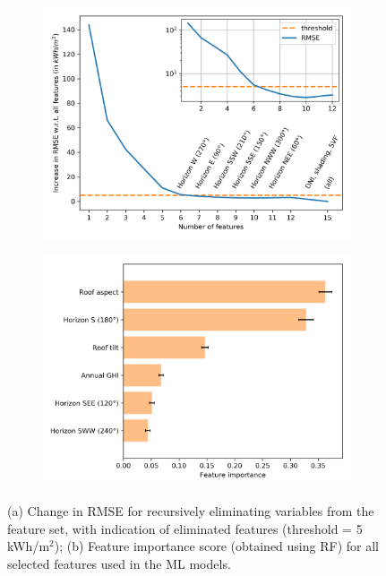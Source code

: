 \begin{figure}[tb]
\centering
\begin{subfigure}{.49\textwidth}
  \centering
  \includegraphics[width=\linewidth]{images/Figs/ftr_selection_topdown_reduced_run1_w_excluded.png}
  \subcaption{}
  \label{fig:chile_RFE}
\end{subfigure}
\begin{subfigure}{.49\textwidth}
  \centering
  \includegraphics[width=\linewidth]{images/Figs/Feature_importance_selFtrs_mean_10k.png}  
  \subcaption{}
    \label{fig:chile_FtrImp}
\end{subfigure}
\caption{(a) Change in RMSE for recursively eliminating variables from the feature set, with indication of eliminated features (threshold = 5 kWh/m$^2$); (b) Feature importance score (obtained using RF) for all selected features used in the ML models.}
\label{fig:chile_ftrs}
\end{figure}


